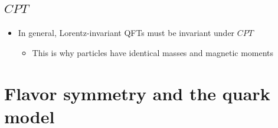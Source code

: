 \subsection{$CPT$}
\begin{itemize}
  \item In general, Lorentz-invariant QFTs must be invariant under $CPT$
  \begin{itemize}
    \item This is why particles have identical masses and magnetic moments
  \end{itemize}
\end{itemize}

\section{Flavor symmetry and the quark model}

